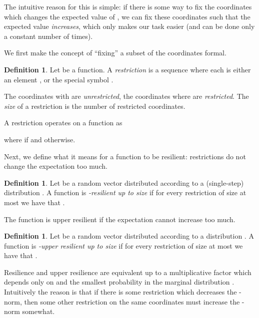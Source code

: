 \documentclass{daj}
\newcommand{\1}{\mathbbm{1}}
\theoremstyle{plain}
\theoremstyle{definition}
\newtheorem{definition}[theorem]{Definition}
\begin{document}
The intuitive reason for this is simple: if there is some way to fix
the coordinates which changes the expected value of , we
can fix these coordinates such that the expected value \emph{increases}, 
which only makes our task easier
(and can be done only a constant number of times).

\medskip

We first make the concept of ``fixing'' a subset of the coordinates formal.

\begin{definition}
Let  be a function.
A \emph{restriction}  is a sequence 
where each  is either an element ,
or the special symbol .

The coordinates with  are \emph{unrestricted}, the coordinates
where  are \emph{restricted}.
The \emph{size} of a restriction is the number of restricted coordinates.

A restriction  operates on a function  as

where  if  and  otherwise.
\end{definition}

Next, we define what it means for a function to be resilient:
restrictions do not change the expectation too much.
\begin{definition}
Let  be a random vector distributed according
to a (single-step) distribution .
A function  is \emph{-resilient up to
size } if for every restriction  of size at most  we have that
.
\end{definition}

The function is upper resilient if the expectation cannot increase too much.
\begin{definition}
Let  be a random vector distributed according
to a distribution .
A function  is \emph{-upper resilient
up to size } if for every 
restriction  of size at most  we have that
.
\end{definition}

Resilience and upper resilience are equivalent up to a multiplicative
factor which depends only on  and the smallest probability in the
marginal distribution  .
Intuitively the reason is that if there is some restriction which
decreases the -norm, then some other restriction on the same
coordinates must increase the -norm somewhat.
\end{document}
